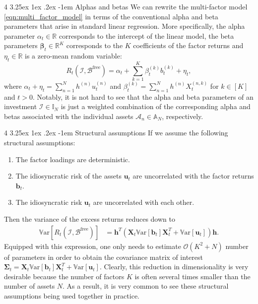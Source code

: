 \documentclass[12pt]{article}
\makeatletter
\renewcommand\paragraph{%
	\@startsection{paragraph}
	{4}
	{\z@}
	{3.25ex \@plus1ex \@minus.2ex}
	{-1em}
	{\normalfont\normalsize\bfseries\maybe@addperiod}%
}
\newcommand{\maybe@addperiod}[1]{%
	#1\@addpunct{.}%
}
\makeatother
\begin{document}
\paragraph{Alphas and betas} We can rewrite the multi-factor model \eqref{eqn:multi_factor_model} in terms of the conventional alpha and beta parameters that arise in standard linear regression. More specifically, the alpha parameter $\alpha_t \in \mathbb{R}$ corresponds to the intercept of the linear model, the beta parameters $\boldsymbol{\beta}_t \in \mathbb{R}^K$ corresponds to the $K$ coefficients of the factor returns and $\eta_t \in \mathbb{R}$ is a zero-mean random variable:
\begin{equation}
	R_t(\mathcal{I}, \mathcal{B}^{\text{free}}) 
	= \alpha_t + \sum_{k=1}^K \beta_t^{(k)} b_t^{(k)} + \eta_t,
\end{equation}
where $\alpha_t + \eta_t = \sum_{n=1}^N h^{(n)} u_t^{(n)}$ and $\beta_t^{(k)} = \sum_{n=1}^N h^{(n)} X_t^{(n, k)}$ for $k \in [K]$ and $t > 0$. Notably, it is not hard to see that the alpha and beta parameters of an investment $\mathcal{I} \in \mathbb{I}_N$ is just a weighted combination of the corresponding alpha and betas associated with the individual assets $\mathcal{A}_n \in \mathbb{A}_N$, respectively.

\paragraph{Structural assumptions} If we assume the following structural assumptions:
\begin{enumerate}
	\item The factor loadings are deterministic.
	\item The idiosyncratic risk of the assets $\mathbf{u}_t$ are uncorrelated with the factor returns $\mathbf{b}_t$.
	\item The idiosyncratic risk $\mathbf{u}_t$ are uncorrelated with each other.
\end{enumerate}
Then the variance of the excess returns reduces down to
\begin{align}
	\mathbb{V}\text{ar}[R_t(\mathcal{I}, \mathcal{B}^{\text{free}})]
	&= \mathbf{h}^T \left( \mathbf{X}_t\mathbb{V}\text{ar}[\mathbf{b}_t] \mathbf{X}_t^T + \mathbb{V}\text{ar}[\mathbf{u}_t]\right) \mathbf{h}.
\end{align}
Equipped with this expression, one only needs to estimate $\mathcal{O}(K^2 + N)$ number of parameters in order to obtain the covariance matrix of interest $\boldsymbol{\Sigma}_t = \mathbf{X}_t\mathbb{V}\text{ar}[\mathbf{b}_t] \mathbf{X}_t^T + \mathbb{V}\text{ar}[\mathbf{u}_t]$. Clearly, this reduction in dimensionality is very desirable because the number of factors $K$ is often several times smaller than the number of assets $N$. As a result, it is very common to see these structural assumptions being used together in practice. 
\end{document}
